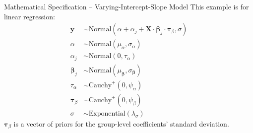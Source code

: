 \begin{frame}{Mathematical Specification -- Varying-Intercept-Slope Model}
	This example is for linear regression:
	$$
		\begin{aligned}
			\mathbf{y}              & \sim \text{Normal}\left( \alpha + \alpha_j + \mathbf{X} \cdot \boldsymbol{\beta}_j \cdot \boldsymbol{\tau}_\beta, \sigma \right) \\
			\alpha                  & \sim \text{Normal}(\mu_\alpha, \sigma_\alpha)                                                                                    \\
			\alpha_j                & \sim \text{Normal}(0, \tau_\alpha)                                                                                               \\
			\boldsymbol{\beta}_j    & \sim \text{Normal}(\mu_{\boldsymbol{\beta}}, \sigma_{\boldsymbol{\beta}})                                                        \\
			\tau_\alpha             & \sim \text{Cauchy}^+(0, \psi_{\alpha})                                                                                           \\
			\boldsymbol{\tau}_\beta & \sim \text{Cauchy}^+(0, \psi_{\beta})                                                                                            \\
			\sigma                  & \sim \text{Exponential}(\lambda_\sigma)
		\end{aligned}
	$$
	$\boldsymbol{\tau}_\beta$ is a vector of priors for the group-level coefficients'
	standard deviation.
\end{frame}

